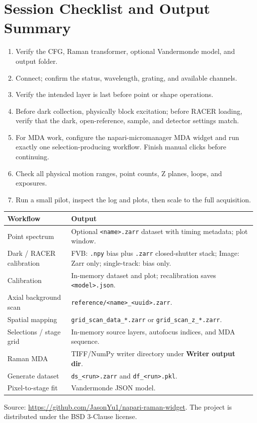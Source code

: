 \documentclass[11pt,oneside]{report}
\newcommand{\ui}[1]{\textbf{#1}}
\newcommand{\code}[1]{\texttt{#1}}
\begin{document}
\chapter{Session Checklist and Output Summary}
\begin{enumerate}
  \item Verify the CFG, Raman transformer, optional Vandermonde model, and output folder.
  \item Connect; confirm the status, wavelength, grating, and available channels.
  \item Verify the intended layer is last before point or shape operations.
  \item Before dark collection, physically block excitation; before RACER loading,
        verify that the dark, open-reference, sample, and detector settings match.
  \item For MDA work, configure the napari-micromanager MDA widget and run exactly one
        selection-producing workflow. Finish manual clicks before continuing.
  \item Check all physical motion ranges, point counts, Z planes, loops, and exposures.
  \item Run a small pilot, inspect the log and plots, then scale to the full acquisition.
\end{enumerate}

\begin{longtable}{@{}p{}p{}@{}}
\toprule\textbf{Workflow} & \textbf{Output}\\\midrule
Point spectrum & Optional \code{<name>.zarr} dataset with timing metadata; plot window.\\
Dark / RACER calibration & FVB: \code{.npy} bias plus \code{.zarr} closed-shutter
stack; Image: Zarr only; single-track: bias only.\\
Calibration & In-memory dataset and plot; recalibration saves \code{<model>.json}.\\
Axial background scan & \code{reference/<name>\_<uuid>.zarr}.\\
Spatial mapping & \code{grid\_scan\_data\_*.zarr} or \code{grid\_scan\_z\_*.zarr}.\\
Selections / stage grid & In-memory source layers, autofocus indices, and MDA sequence.\\
Raman MDA & TIFF/NumPy writer directory under \ui{Writer output dir}.\\
Generate dataset & \code{ds\_<run>.zarr} and \code{df\_<run>.pkl}.\\
Pixel-to-stage fit & Vandermonde JSON model.\\\bottomrule
\end{longtable}

Source: \url{https://github.com/JasonYu1/napari-raman-widget}. The project is
distributed under the BSD 3-Clause license.
\end{document}
